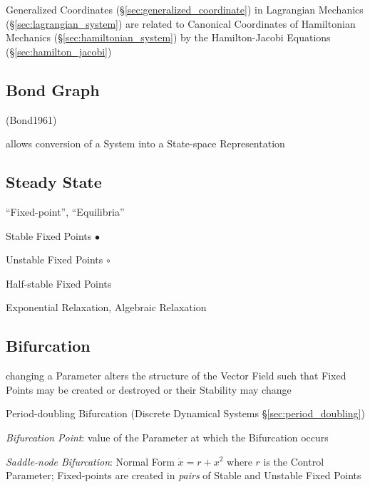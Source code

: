 Generalized Coordinates (\S\ref{sec:generalized_coordinate}) in Lagrangian
Mechanics (\S\ref{sec:lagrangian_system}) are related to Canonical Coordinates
of Hamiltonian Mechanics (\S\ref{sec:hamiltonian_system}) by the
Hamilton-Jacobi Equations (\S\ref{sec:hamilton_jacobi})



\subsection{Bond Graph}\label{sec:bond_graph}

(Bond1961)

allows conversion of a System into a State-space Representation



\subsection{Steady State}\label{sec:steady_state}

``Fixed-point'', ``Equilibria'' %

Stable Fixed Points $\bullet$

Unstable Fixed Points $\circ$

Half-stable Fixed Points

Exponential Relaxation, Algebraic Relaxation



\subsection{Bifurcation}\label{sec:bifurcation}

changing a Parameter alters the structure of the Vector Field such that Fixed
Points may be created or destroyed or their Stability may change

\fist Period-doubling Bifurcation (Discrete Dynamical Systems
\S\ref{sec:period_doubling})

\emph{Bifurcation Point}: value of the Parameter at which the Bifurcation
occurs

\emph{Saddle-node Bifurcation}: Normal Form $\dot{x} = r + x^2$ where $r$ is
the Control Parameter;
Fixed-points are created in \emph{pairs} of Stable and Unstable Fixed Points


